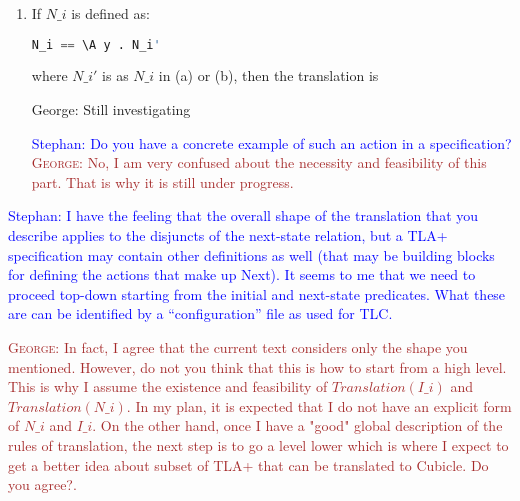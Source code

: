 \documentclass{article}
\theoremstyle{plain}
\numberwithin{equation}{section}
\newcommand{\george}[1]{\textcolor{brown}{\textsc{George: } {\sf #1}}}
\newcommand{\ste}[1]{\par\noindent\textcolor{blue}{\small Stephan: #1}}
\begin{document}
\begin{enumerate}
\item If  $N\_i$ is defined as:
\begin{lstlisting}[language=Python]
N_i == \A y . N_i' 
\end{lstlisting}
where $N\_i' $ is as $N\_i$  in (a) or (b), then the translation is 

\color{red} George: Still investigating \color{black}

\ste{Do you have a concrete example of such an action in a specification?}
\george{No,  I am very confused about the necessity and feasibility of this part. That is why it is still under progress. }
\end{enumerate}

\ste{I have the feeling that the overall shape of the translation that you
  describe applies to the disjuncts of the next-state relation, but a TLA+
  specification may contain other definitions as well (that may be building
  blocks for defining the actions that make up Next). It seems to me that we
  need to proceed top-down starting from the initial and next-state predicates.
  What these are can be identified by a ``configuration'' file as used for TLC.}

  \george{In fact, I agree that the current text considers only the shape you mentioned. However, do not you think that this is how to start from a high level. This is why I assume the existence and feasibility of \emph{$Translation(I\_i)$} and \emph{$Translation(N\_i)$}. In my plan, it is expected that I do not have an explicit form of $N\_i$ and $I\_i$. On the other hand, once I have a "good" global description of the rules of translation, the next step is to go a level lower which is where I expect to get a better idea about subset of TLA+ that can be translated to Cubicle. Do you agree?. }




\fi
\end{document}
